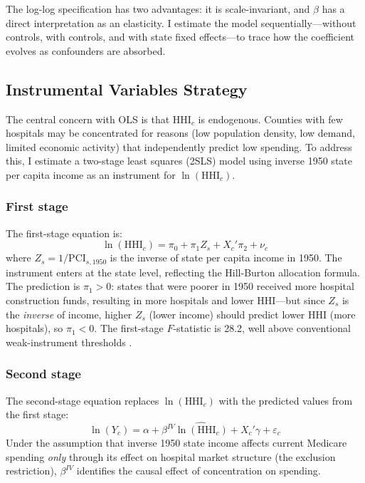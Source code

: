 \documentclass[12pt]{article}
\begin{document}
The log-log specification has two advantages: it is scale-invariant, and $\beta$ has a direct interpretation as an elasticity. I estimate the model sequentially---without controls, with controls, and with state fixed effects---to trace how the coefficient evolves as confounders are absorbed.

\subsection{Instrumental Variables Strategy}

The central concern with OLS is that $\text{HHI}_c$ is endogenous. Counties with few hospitals may be concentrated for reasons (low population density, low demand, limited economic activity) that independently predict low spending. To address this, I estimate a two-stage least squares (2SLS) model using inverse 1950 state per capita income as an instrument for $\ln(\text{HHI}_c)$.

\subsubsection*{First stage} The first-stage equation is:
\begin{equation}
\label{eq:first}
\ln(\text{HHI}_c) = \pi_0 + \pi_1 Z_s + X_c'\pi_2 + \nu_c
\end{equation}
where $Z_s = 1 / \text{PCI}_{s,1950}$ is the inverse of state per capita income in 1950. The instrument enters at the state level, reflecting the Hill-Burton allocation formula. The prediction is $\pi_1 > 0$: states that were poorer in 1950 received more hospital construction funds, resulting in more hospitals and lower HHI---but since $Z_s$ is the \emph{inverse} of income, higher $Z_s$ (lower income) should predict lower HHI (more hospitals), so $\pi_1 < 0$. The first-stage $F$-statistic is 28.2, well above conventional weak-instrument thresholds \citep{stock2005testing, staiger1997instrumental}.

\subsubsection*{Second stage} The second-stage equation replaces $\ln(\text{HHI}_c)$ with the predicted values from the first stage:
\begin{equation}
\label{eq:second}
\ln(Y_c) = \alpha + \beta^{IV} \widehat{\ln(\text{HHI}_c)} + X_c'\gamma + \varepsilon_c
\end{equation}
Under the assumption that inverse 1950 state income affects current Medicare spending \emph{only} through its effect on hospital market structure (the exclusion restriction), $\beta^{IV}$ identifies the causal effect of concentration on spending.
\end{document}
